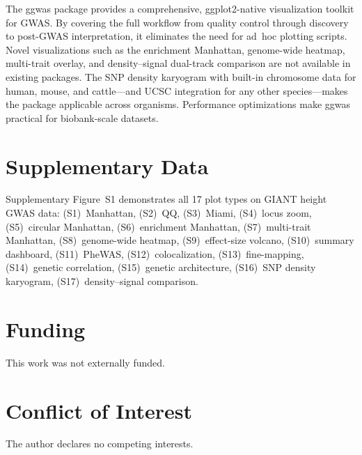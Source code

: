 \documentclass{bioinfo}
\begin{document}
The ggwas package provides a comprehensive, ggplot2-native visualization toolkit for GWAS. By covering the full workflow from quality control through discovery to post-GWAS interpretation, it eliminates the need for ad~hoc plotting scripts. Novel visualizations such as the enrichment Manhattan, genome-wide heatmap, multi-trait overlay, and density--signal dual-track comparison are not available in existing packages. The SNP density karyogram with built-in chromosome data for human, mouse, and cattle---and UCSC integration for any other species---makes the package applicable across organisms. Performance optimizations make ggwas practical for biobank-scale datasets.

\section*{Supplementary Data}

Supplementary Figure~S1 demonstrates all 17 plot types on GIANT height GWAS data: (S1)~Manhattan, (S2)~QQ, (S3)~Miami, (S4)~locus zoom, (S5)~circular Manhattan, (S6)~enrichment Manhattan, (S7)~multi-trait Manhattan, (S8)~genome-wide heatmap, (S9)~effect-size volcano, (S10)~summary dashboard, (S11)~PheWAS, (S12)~colocalization, (S13)~fine-mapping, (S14)~genetic correlation, (S15)~genetic architecture, (S16)~SNP density karyogram, (S17)~density--signal comparison.

\section*{Funding}

This work was not externally funded.

\section*{Conflict of Interest}

The author declares no competing interests.


\end{document}
